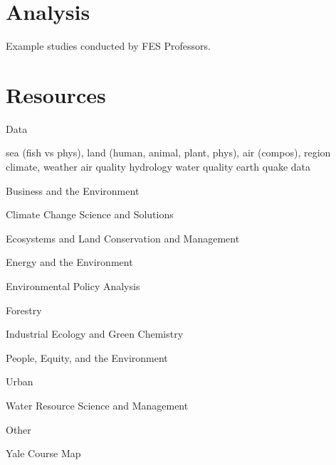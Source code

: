 \documentclass[
]{book}
\begin{document}
\hypertarget{analysis}{%
\chapter{Analysis}\label{analysis}}

Example studies conducted by FES Professors.

\hypertarget{resources}{%
\chapter{Resources}\label{resources}}

Data

sea (fish vs phys), land (human, animal, plant, phys), air (compos), region
climate, weather
air quality
hydrology
water quality
earth quake data

Business and the Environment

Climate Change Science and Solutions

Ecosystems and Land Conservation and Management

Energy and the Environment

Environmental Policy Analysis

Forestry

Industrial Ecology and Green Chemistry

People, Equity, and the Environment

Urban

Water Resource Science and Management

Other

Yale Course Map

  
\end{document}

